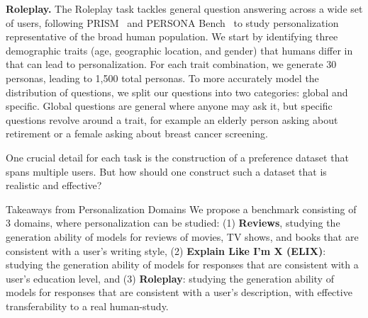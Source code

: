 \noindent \textbf{Roleplay.} The Roleplay task tackles general question answering across a wide set of users, following PRISM~\citep{kirk2024prismalignmentdatasetparticipatory} and PERSONA Bench~\citep{castricato2024personareproducibletestbedpluralistic} to study personalization representative of the broad human population. We start by identifying three demographic traits (age, geographic location, and gender) that humans differ in that can lead to personalization. For each trait combination, we generate 30 personas, leading to 1,500 total personas. To more accurately model the distribution of questions, we split our questions into two categories: global and specific. Global questions are general where anyone may ask it, but specific questions revolve around a trait, for example an elderly person asking about retirement or a female asking about breast cancer screening.

One crucial detail for each task is the construction of a preference dataset that spans multiple users. But how should one construct such a dataset that is realistic and effective?

\begin{AIbox}{Takeaways from Personalization Domains}
We propose a benchmark consisting of 3 domains, where personalization can be studied: (1) \textbf{Reviews}, studying the generation ability of models for reviews of movies, TV shows, and books that are consistent with a user’s writing style, (2) \textbf{Explain Like I'm X (ELIX)}: studying the generation ability of models for responses that are consistent with a user’s education level, and (3) \textbf{Roleplay}: studying the generation ability of models for responses that are consistent with a user's description, with effective transferability to a real human-study.
\end{AIbox}